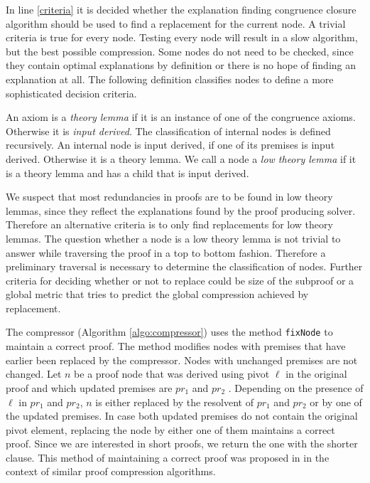 In line \ref{criteria} it is decided whether the explanation finding congruence closure algorithm should be used to find a replacement for the current node.
A trivial criteria is true for every node.
Testing every node will result in a slow algorithm, but the best possible compression.
Some nodes do not need to be checked, since they contain optimal explanations by definition or there is no hope of finding an explanation at all.
The following definition classifies nodes to define a more sophisticated decision criteria.

\begin{definition}

An axiom is a \emph{theory lemma} if it is an instance of one of the congruence axioms.
Otherwise it is \emph{input derived}.
The classification of internal nodes is defined recursively.
An internal node is input derived, if one of its premises is input derived.
Otherwise it is a theory lemma.
We call a node a \emph{low theory lemma} if it is a theory lemma and has a child that is input derived.

\end{definition}

We suspect that most redundancies in proofs are to be found in low theory lemmas, since they reflect the explanations found by the proof producing solver.
Therefore an alternative criteria is to only find replacements for low theory lemmas.
The question whether a node is a low theory lemma is not trivial to answer while traversing the proof in a top to bottom fashion.
Therefore a preliminary traversal is necessary to determine the classification of nodes.
Further criteria for deciding whether or not to replace could be size of the subproof or a global metric that tries to predict the global compression achieved by replacement.



The compressor (Algorithm \ref{algo:compressor}) uses the method \texttt{fixNode} to maintain a correct proof.
The method modifies nodes with premises that have earlier been replaced by the compressor. 
Nodes with unchanged premises are not changed.
Let $n$ be a proof node that was derived using pivot $\ell$ in the original proof and which updated premises are $pr_1$ and $pr_2$ .
Depending on the presence of $\ell$ in $pr_1$ and $pr_2$, $n$ is either replaced by the resolvent of $pr_1$ and $pr_2$ or by one of the updated premises.
In case both updated premises do not contain the original pivot element, replacing the node by either one of them maintains a correct proof.
Since we are interested in short proofs, we return the one with the shorter clause.
This method of maintaining a correct proof was proposed in \cite{Bar-Ilan2008} in the context of similar proof compression algorithms.

